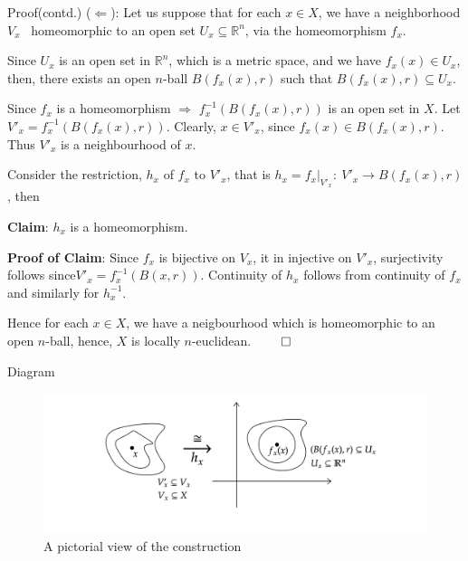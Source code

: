 \documentclass{beamer}
\begin{document}
\begin{frame}
\begin{block}{Proof(contd.)}
($\displaystyle \Leftarrow $): Let us suppose that for each $\displaystyle x\in X$, we have a neighborhood $\displaystyle V_{x}$ \ homeomorphic to an open set $\displaystyle U_{x} \subseteq \mathbb{R}^{n}$, via the homeomorphism $\displaystyle f_{x}$.  

Since $\displaystyle U_{x}$ is an open set in $\displaystyle \mathbb{R}^{n}$, which is a metric space, and we have $\displaystyle f_{x}( x) \in U_{x}$, then, there exists an open $\displaystyle n$-ball $\displaystyle B( f_{x}( x) ,r)$ such that $\displaystyle B( f_{x}( x) ,r) \subseteq U_{x}$. 


Since $\displaystyle f_{x}$ is a homeomorphism $\displaystyle \Rightarrow $ $\displaystyle f_{x}^{-1}( B( f_{x}( x) ,r))$ is an open set in $\displaystyle X$. Let $\displaystyle V'_{x} =f_{x}^{-1}( B( f_{x}(x),r))$. Clearly, $\displaystyle x\in V'_{x}$, since $\displaystyle f_{x}( x) \in B( f_{x}(x),r)$. Thus $\displaystyle V'_{x}$ is a neighbourhood of $\displaystyle x$. 

Consider the restriction, $\displaystyle h_{x}$ of $\displaystyle f_{x}$ to $\displaystyle V'_{x}$, that is $\displaystyle h_{x} =f_{x} |_{V'_{x}} :\ V'_{x}\rightarrow B( f_{x}( x) ,r)$, then

\textbf{Claim}: $\displaystyle h_{x}$ is a homeomorphism. 

\textbf{Proof of Claim}: Since $\displaystyle f_{x}$ is bijective on $\displaystyle V_{x}$, it in injective on $\displaystyle V'_{x}$, surjectivity follows since$\displaystyle V'_{x} =f_{x}^{-1}( B( x,r))$. Continuity of $\displaystyle h_{x}$ follows from continuity of $\displaystyle f_{x}$ and similarly for $\displaystyle h_{x}^{-1}$. 

Hence for each $\displaystyle x\in X$, we have a neigbourhood which is homeomorphic to an open $\displaystyle n$-ball, hence, $\displaystyle X$ is locally $\displaystyle n$-euclidean. $\displaystyle \qed $ 
\end{block}
\end{frame}
\begin{frame}{Diagram}
\begin{figure}
    \centering
    \includegraphics[width = 1.1\textwidth]{diag-2.png}
    \caption{A pictorial view of the construction}
\end{figure}
\end{frame}
\end{document}

